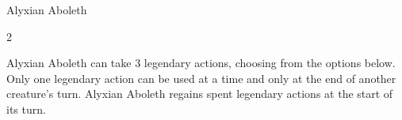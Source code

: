 \documentclass[10pt,a4paper,twoside,bg=none,twocolumn,openany,nodeprecatedcode]{dndbook}
\begin{document}
\begin{DndMonster}[float*=b,width=\textwidth + 8pt]{Alyxian Aboleth}
\begin{multicols}{2}
\par
{}
Alyxian Aboleth can take 3 legendary actions, choosing from the options below. Only one legendary action can be used at a time and only at the end of another creature's turn. Alyxian Aboleth regains spent legendary actions at the start of its turn.

\begin{DndMonsterLegendaryActions}
\end{DndMonsterLegendaryActions}
\end{multicols}
\end{DndMonster}
\end{document}
